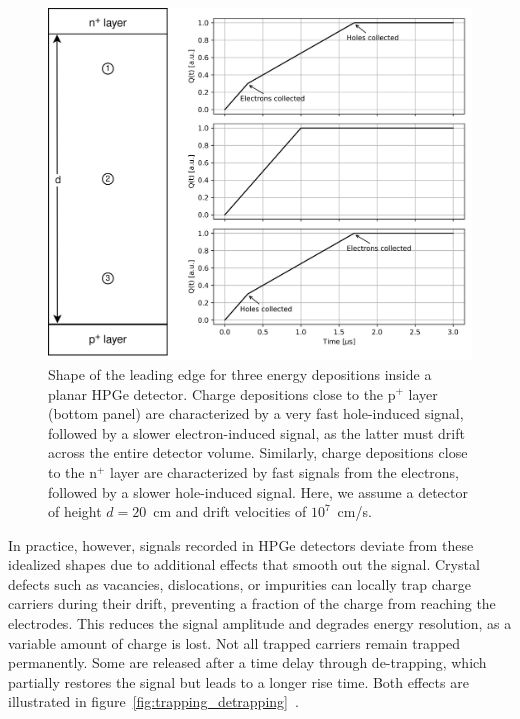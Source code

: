 \begin{figure}
    \centering
    \includegraphics[width=0.85\linewidth]{figures/03_legend/Charge_collection_planar.png}
    \caption{Shape of the leading edge for three energy depositions inside a planar HPGe detector. Charge depositions close to the p$^+$ layer (bottom panel) are characterized by a very fast hole-induced signal, followed by a slower electron-induced signal, as the latter must drift across the entire detector volume. Similarly, charge depositions close to the n$^+$ layer are characterized by fast signals from the electrons, followed by a slower hole-induced signal. Here, we assume a detector of height $d=20$~cm and drift velocities of $10^{7}$~cm/s.}
\label{fig:Pulse_shape}
\end{figure}

In practice, however, signals recorded in HPGe detectors deviate from these idealized shapes due to additional effects that smooth out the signal. 
Crystal defects such as vacancies, dislocations, or impurities can locally trap charge carriers during their drift, preventing a fraction of the charge from reaching the electrodes. This reduces the signal amplitude and degrades energy resolution, as a variable amount of charge is lost.
Not all trapped carriers remain trapped permanently. Some are released after a time delay through de-trapping, which partially restores the signal but leads to a longer rise time. Both effects are illustrated in figure~\ref{fig:trapping_detrapping}~\cite{knoll_radiation_2000}. 


